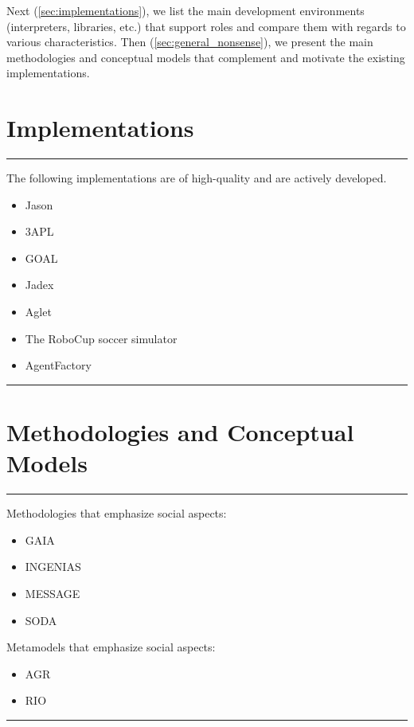 \documentclass{article}
\newenvironment{notes}{\medskip\hrule\smallskip\narrower}{\smallskip\hrule\medskip}
\begin{document}
Next (\autoref{sec:implementations}), we list the main development environments (interpreters, libraries, etc.) that support roles and compare them with regards to various characteristics.
Then (\autoref{sec:general_nonsense}), we present the main methodologies and conceptual models  that complement and motivate the existing implementations.

\section{Implementations}\label{sec:implementations} %

\begin{notes}
The following implementations are of high-quality and are actively developed.
\begin{itemize}
\item Jason~\cite{books/sp/map2005/BordiniHV05}
\item 3APL~\cite{books/sp/map2005/DastaniRM05}
\item GOAL~\cite{hindriks2009programmingrationalagents}
\item Jadex~\cite{todo}
\item Aglet~\cite{todo}
\item The RoboCup soccer simulator
\item AgentFactory
\end{itemize}
\end{notes}

\section{Methodologies and Conceptual Models}\label{sec:general_nonsense} %

\begin{notes}
Methodologies that emphasize social aspects:
\begin{itemize}
\item GAIA~\cite{journals/aamas/WooldridgeJK00}
\item INGENIAS
\item MESSAGE
\item SODA
\end{itemize}
Metamodels that emphasize social aspects:
\begin{itemize}
\item AGR~\cite{conf/aose/FerberGM03}
\item RIO
\end{itemize}
\end{notes}
\end{document}
